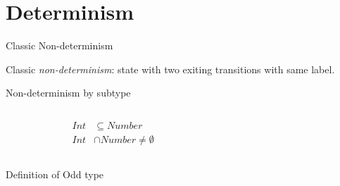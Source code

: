 \section{Determinism}

\begin{frame}{Classic Non-determinism}
  \scalebox{0.8}{}

  Classic \emph{non-determinism}: state with two exiting transitions with same label.

\end{frame}

\begin{frame}{Non-determinism by subtype}
  \begin{columns}
    \begin{column}{0.4\textwidth}
      \centering

    \begin{align*}
    Int&\subseteq Number\\
    Int &\cap Number \neq \emptyset
  \end{align*}
  \scalebox{0.8}{}
    \end{column}%
    \begin{column}{0.6\textwidth}
      \only<1>{\scalebox{0.65}{}}%
    \end{column}

  \end{columns}
\end{frame}



\newsavebox\oddbox
\begin{lrbox}{\oddbox}
  \begin{minipage}{11cm}
    
  \end{minipage}
\end{lrbox}

\begin{frame}{Definition of Odd type}
  \usebox\oddbox
\end{frame}



